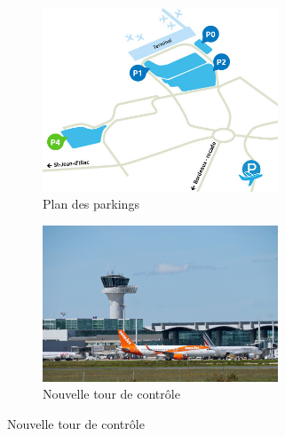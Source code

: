 \begin{figure}[hbt!]
    \begin{subfigure}{0.5\textwidth}
      \centering
      \includegraphics[width=7cm]{Images/parkings.jpg}  
      \caption{Plan des parkings}
      \label{fig:parking4}
    \end{subfigure}
    \begin{subfigure}{0.5\textwidth}
      \centering
      \includegraphics[width=7cm]{Images/tour.jpg}  
      \caption{Nouvelle tour de contrôle}
      \label{fig:tour}
    \end{subfigure}
        

\end{figure}
